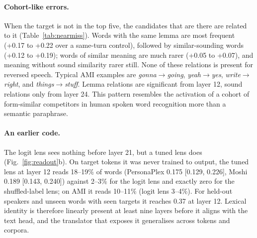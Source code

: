 \documentclass[11pt,a4paper]{article}
\newcommand{\PP}{PersonaPlex}
\begin{document}
\begin{table}[t]
\centering\small
\setlength\tabcolsep{3pt}
\resizebox{\columnwidth}{!}{}
\caption{When the target word is not in the top five: excess rate at layer 28 of top-five candidates related to the heard word, over the same relation to other words of the same turn. Relations from WordNet lemmas \citep{miller1995wordnet}, CMUdict phone edit distance and sentence-embedding similarity; the last two rows exclude the other relation. On reversed speech all rates are within $\pm0.015$. $^{*}$: CI excludes zero.}
\label{tab:nearmiss}
\end{table}

\paragraph{Cohort-like errors.}
When the target is not in the top five, the candidates that are there are related to it (Table~\ref{tab:nearmiss}).
Words with the same lemma are most frequent (+0.17 to +0.22 over a same-turn control), followed by similar-sounding words (+0.12 to +0.19); words of similar meaning are much rarer (+0.05 to +0.07), and meaning without sound similarity rarer still.
None of these relations is present for reversed speech.
Typical AMI examples are \emph{gonna}$\to$\emph{going}, \emph{yeah}$\to$\emph{yes}, \emph{write}$\to$\emph{right}, and \emph{things}$\to$\emph{stuff}.
Lemma relations are significant from layer 12, sound relations only from layer 24.
This pattern resembles the activation of a cohort of form-similar competitors in human spoken word recognition \citep{marslenwilson1987} more than a semantic paraphrase.

\paragraph{An earlier code.}
The logit lens sees nothing before layer 21, but a tuned lens does (Fig.~\ref{fig:readout}b).
On target tokens it was never trained to output, the tuned lens at layer 12 reads 18--19\% of words (\PP{} 0.175 [0.129, 0.226], Moshi 0.189 [0.143, 0.240]) against 2--3\% for the logit lens and exactly zero for the shuffled-label lens; on AMI it reads 10--11\% (logit lens 3--4\%).
For held-out speakers and unseen words with seen targets it reaches 0.37 at layer 12.
Lexical identity is therefore linearly present at least nine layers before it aligns with the text head, and the translator that exposes it generalises across tokens and corpora.
\end{document}
